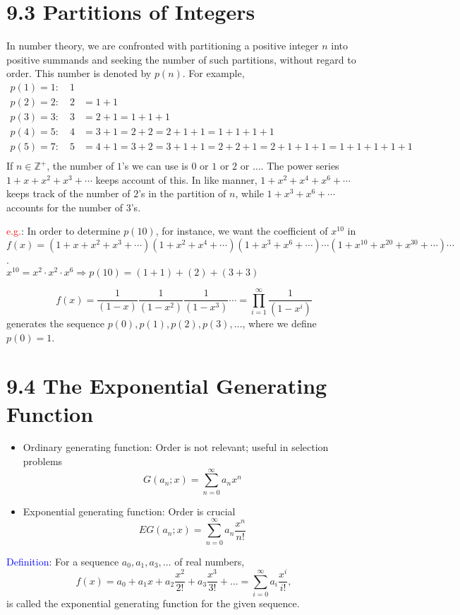 \documentclass[a4paper]{article}
\begin{document}
\section*{9.3 Partitions of Integers}
In number theory, we are confronted with partitioning a positive integer $n$ into positive summands and seeking the number of such partitions, without regard to order. This number is denoted by $p(n)$. For example,
\begin{align*}
p(1) = 1:\quad 1&\\
p(2) = 2:\quad 2& = 1+1\\
p(3) = 3:\quad 3& = 2+1 = 1+1+1\\
p(4) = 5:\quad 4&=3+1=2+2=2+1+1=1+1+1+1\\
p(5) = 7:\quad 5&=4+1=3+2=3+1+1=2+2+1=2+1+1+1=1+1+1+1+1\\
\end{align*}
If $n\in \mathbb{Z}^+$, the number of $1$'s we can use is $0$ or $1$ or $2$ or $\dots$. The power series $1+x+x^2+x^3+\cdots$ keeps account of this. In like manner, $1+x^2+x^4+x^6+\cdots$ keeps track of the number of $2$'s in the partition of $n$, while $1+x^3+x^6+\cdots$ accounts for the number of $3$'s.

\textcolor{red}{e.g.}: In order to determine $p(10)$, for instance, we want the coefficient of $x^{10}$ in $f(x)=(1+x+x^2+x^3+\cdots)(1+x^2+x^4+\cdots)(1+x^3+x^6+\cdots)\cdots(1+x^{10}+x^{20}+x^{30}+\cdots)\cdots$.\\
$x^{10}=x^2\cdot x^2\cdot x^6\Rightarrow p(10)=(1+1)+(2)+(3+3)$

$$f(x)=\frac{1}{(1-x)}\frac{1}{(1-x^2)}\frac{1}{(1-x^3)}\cdots=\prod_{i=1}^{\infty}{\frac{1}{(1-x^i)}}$$ generates the sequence $p(0),p(1),p(2),p(3),\ldots$, where we define $p(0)=1$.

\section*{9.4 The Exponential Generating Function}
\begin{itemize}
    \item Ordinary generating function: Order is not relevant; useful in selection problems
    $$G(a_n;x)=\sum_{n=0}^{\infty}{a_nx^n}$$
    \item Exponential generating function: Order is crucial
    $$EG(a_n;x)=\sum_{n=0}^{\infty}{a_n\frac{x^n}{n!}}$$
\end{itemize}
\textcolor{blue}{Definition}: For a sequence $a_0, a_1, a_3, \dots$ of real numbers, $$f(x)=a_0+a_1x+a_2\frac{x^2}{2!}+a_3\frac{x^3}{3!}+\dots=\sum_{i=0}^{\infty}{a_i\frac{x^i}{i!}},$$ 
is called the exponential generating function for the given sequence.
\end{document}
